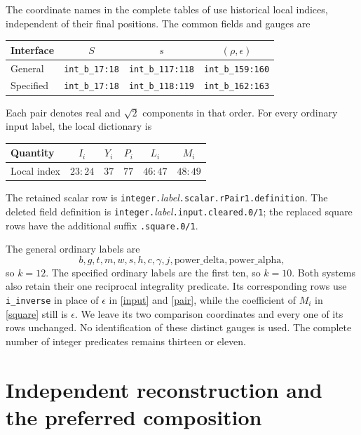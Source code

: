 \documentclass[11pt]{article}
\begin{document}
The coordinate names in the complete tables of \cite{v102,v103,bb}
use historical local indices, independent of their final positions.
The common fields and gauges are
\begin{center}
\begin{tabular}{@{}lccc@{}}
\toprule
Interface & $S$ & $s$ & $(\rho,\epsilon)$\\
\midrule
General & \texttt{int\_b\_17:18} & \texttt{int\_b\_117:118}
 & \texttt{int\_b\_159:160}\\
Specified & \texttt{int\_b\_17:18} & \texttt{int\_b\_118:119}
 & \texttt{int\_b\_162:163}\\
\bottomrule
\end{tabular}
\end{center}
Each pair denotes real and $\sqrt2$ components in that order.
For every ordinary input label, the local dictionary is
\begin{center}
\begin{tabular}{@{}lccccc@{}}
\toprule
Quantity & $I_i$ & $Y_i$ & $P_i$ & $L_i$ & $M_i$\\
\midrule
Local index & $23:24$ & $37$ & $77$ & $46:47$ & $48:49$\\
\bottomrule
\end{tabular}
\end{center}
The retained scalar row is
\texttt{integer.}\emph{label}\texttt{.scalar.rPair1.definition}.
The deleted field definition is
\texttt{integer.}\emph{label}\texttt{.input.cleared.0/1};
the replaced square rows have the additional suffix
\texttt{.square.0/1}.

The general ordinary labels are
\[
 b,g,t,m,w,s,h,c,\gamma,j,\mathrm{power\_delta},\mathrm{power\_alpha},
\]
so $k=12$. The specified ordinary labels are the first ten, so
$k=10$. Both systems also retain their one reciprocal integrality
predicate. Its corresponding rows use \texttt{i\_inverse} in
place of $\epsilon$ in \eqref{input} and \eqref{pair}, while the
coefficient of $M_i$ in \eqref{square} still is $\epsilon$.
We leave its two comparison coordinates and every one of its
rows unchanged. No identification of these distinct gauges is
used. The complete number of integer predicates remains thirteen
or eleven.

\section{Independent reconstruction and the preferred composition}
\end{document}
